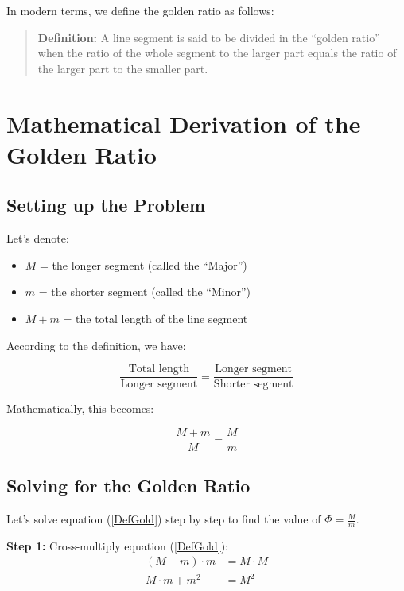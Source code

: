 \documentclass[12pt,a4paper]{article}
\begin{document}
In modern terms, we define the golden ratio as follows:

\begin{quote}
\textbf{Definition:} A line segment is said to be divided in the ``golden ratio'' when the ratio of the whole segment to the larger part equals the ratio of the larger part to the smaller part.
\end{quote}

\section{Mathematical Derivation of the Golden Ratio}

\subsection{Setting up the Problem}

Let's denote:

\begin{itemize}
    \item $M$ = the longer segment (called the ``Major'')
    \item $m$ = the shorter segment (called the ``Minor'')
    \item $M + m$ = the total length of the line segment
\end{itemize}

According to the definition, we have:

\begin{equation}
  \frac{\text{Total length}}{\text{Longer segment}} = \frac{\text{Longer segment}}{\text{Shorter segment}}
\end{equation}

Mathematically, this becomes:

\begin{equation}
  \frac{M + m}{M} = \frac{M}{m}
  \label{DefGold}
\end{equation}

\subsection{Solving for the Golden Ratio}

Let's solve equation (\ref{DefGold}) step by step to find the value of $\Phi = \frac{M}{m}$.

\textbf{Step 1:} Cross-multiply equation (\ref{DefGold}):
\begin{align}
  (M + m) \cdot m &= M \cdot M \\
  M \cdot m + m^2 &= M^2
\end{align}
\end{document}
